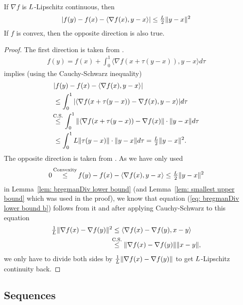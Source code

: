 \begin{lemma}
	\label{Appdx-lem: Lipschitz Gradient implies taylor inequality}
	If \(\nabla f\) is \(L\)-Lipschitz continuous, then
	\begin{align*}
		|f(y) - f(x) - \langle \nabla f(x), y-x\rangle | \le \tfrac{L}2 \|y-x\|^2
	\end{align*}
	If \(f\) is convex, then the opposite direction is also true.
\end{lemma}
\begin{proof}
	The first direction is taken from \textcite[Lemma
	1.2.3]{nesterovLecturesConvexOptimization2018}.
 \begin{align*}
		f(y) = f(x) + \int_0^1\langle\nabla f(x+\tau(y-x)), y-x \rangle d\tau
	\end{align*}
	implies (using the  Cauchy-Schwarz inequality)
	\begin{align*}
		&| f(y) - f(x) - \langle \nabla f(x), y-x\rangle | \\
		&\le \int_0^1 | \langle\nabla f(x+\tau(y-x))-\nabla f(x), y-x\rangle | d\tau \\
		&\lxle{\text{C.S.}}
		\int_0^1 \|\langle\nabla f(x+\tau(y-x))-\nabla f(x)\| \cdot \|y-x\| d\tau\\
		&\le \int_0^1 \ubound \|\tau(y-x)\|\cdot\|y-x\| d\tau
		= \tfrac{\ubound}2 \|y-x\|^2.
	\end{align*}
	The opposite direction is taken from \textcite[Lemma
	2.1.5]{nesterovLecturesConvexOptimization2018}.
	As we have only used
	\begin{align*}
		0\xle{\text{Convexity}} f(y) - f(x) - \langle \nabla f(x), y-x\rangle
		\le \tfrac{\ubound}2 \|y-x\|^2
	\end{align*}	
	in Lemma~\ref{lem: bregmanDiv lower bound} (and Lemma~\ref{lem: smallest upper
	bound} which was used in the proof), we know that equation (\ref{eq:
	bregmanDiv lower bound b}) follows from it and after applying Cauchy-Schwarz
	to this equation
	\begin{align*}
		\tfrac{1}\ubound \|\nabla f(x)-\nabla f(y)\|^2
		&\le \langle \nabla f(x) - \nabla f(y), x-y\rangle \\
		&\lxle{\text{C.S.}} \|\nabla f(x) - \nabla f(y)\| \|x-y\|,
	\end{align*}
	we only have to divide both sides by \(\tfrac{1}{L} \|\nabla f(x)-\nabla
	f(y)\|\) to get \(L\)-Lipschitz continuity back.
\end{proof}

\subsection{Sequences}


